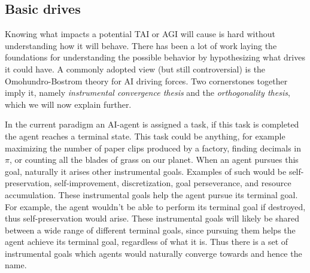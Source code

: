 \documentclass[12pt,A4]{report}
\theoremstyle{definition}
\begin{document}
\subsection{Basic drives}
Knowing what impacts a potential TAI or AGI will cause is hard without understanding how it will behave. There has been a lot of work laying the foundations for understanding the possible behavior by hypothesizing what drives it could have. A commonly adopted view (but still controversial\autocite{Müller Cannon}) is the Omohundro-Bostrom theory for AI driving forces. Two cornerstones together imply it\autocite{O Häggstom}, namely \textit{instrumental convergence thesis} and the \textit{orthogonality thesis}, which we will now explain further.

In the current paradigm an AI-agent is assigned a task, if this task is completed the agent reaches a terminal state. This task could be anything, for example maximizing the number of paper clips produced by a factory, finding decimals in $\pi$, or counting all the blades of grass on our planet. When an agent pursues this goal, naturally it arises other instrumental goals. Examples of such would be self-preservation, self-improvement, discretization, goal perseverance, and resource accumulation\autocite{Omohundro}. These instrumental goals help the agent pursue its terminal goal. For example, the agent wouldn't be able to perform its terminal goal if destroyed, thus self-preservation would arise. These instrumental goals will likely be shared between a wide range of different terminal goals, since pursuing them helps the agent achieve its terminal goal, regardless of what it is. Thus there is a set of instrumental goals which agents would naturally converge towards and hence the name. 

\end{document}
